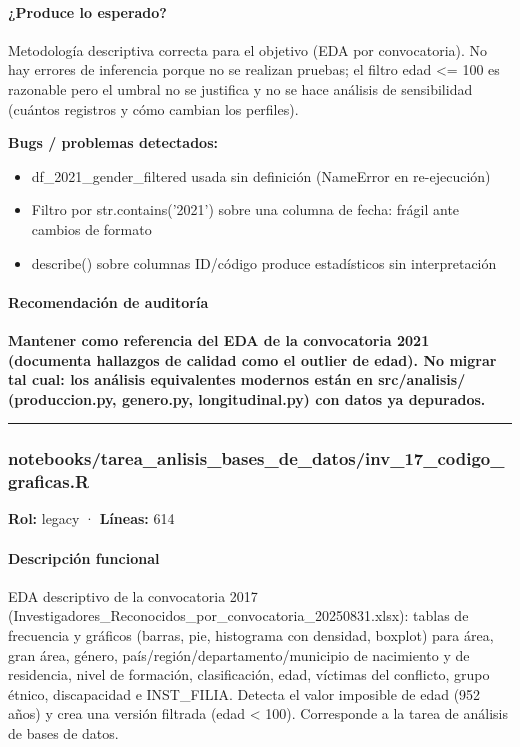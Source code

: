 \paragraph{¿Produce lo esperado?}
Metodología descriptiva correcta para el objetivo (EDA por convocatoria). No hay errores de inferencia porque no se realizan pruebas; el filtro edad <= 100 es razonable pero el umbral no se justifica y no se hace análisis de sensibilidad (cuántos registros y cómo cambian los perfiles).

\begin{tcolorbox}[riesgo]
\textbf{Bugs / problemas detectados:}
\begin{itemize}
  \item df\_2021\_gender\_filtered usada sin definición (NameError en re-ejecución)
  \item Filtro por str.contains('2021') sobre una columna de fecha: frágil ante cambios de formato
  \item describe() sobre columnas ID/código produce estadísticos sin interpretación
\end{itemize}
\end{tcolorbox}

\paragraph{Recomendación de auditoría}
\textbf{Mantener como referencia del EDA de la convocatoria 2021 (documenta hallazgos de calidad como el outlier de edad). No migrar tal cual: los análisis equivalentes modernos están en src/analisis/ (produccion.py, genero.py, longitudinal.py) con datos ya depurados.}

\medskip
\hrule

\subsubsection{notebooks/tarea\_anlisis\_bases\_de\_datos/inv\_17\_codigo\_graficas.R}
\textbf{Rol:} legacy · \textbf{Líneas:} 614

\paragraph{Descripción funcional}
EDA descriptivo de la convocatoria 2017 (Investigadores\_Reconocidos\_por\_convocatoria\_20250831.xlsx): tablas de frecuencia y gráficos (barras, pie, histograma con densidad, boxplot) para área, gran área, género, país/región/departamento/municipio de nacimiento y de residencia, nivel de formación, clasificación, edad, víctimas del conflicto, grupo étnico, discapacidad e INST\_FILIA. Detecta el valor imposible de edad (952 años) y crea una versión filtrada (edad < 100). Corresponde a la tarea de análisis de bases de datos.

